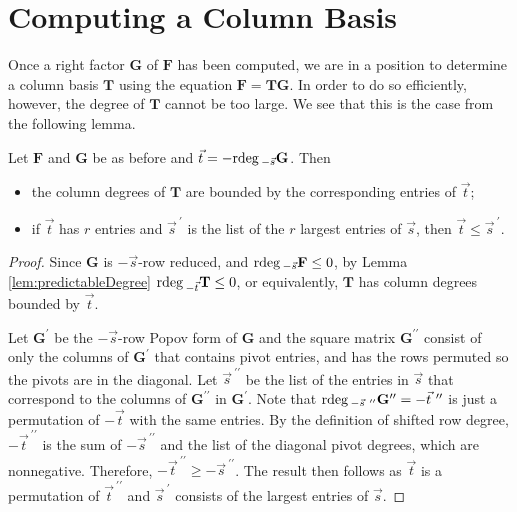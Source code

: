 
\section{Computing a Column Basis}

Once a right factor $\mathbf{G}$ of $\mathbf{F}$ has been computed,
we are in a position to determine a column basis $\mathbf{T}$ using
the equation $\mathbf{F}=\mathbf{T}\mathbf{G}$. In order to do so
efficiently, however, the degree of $\mathbf{T}$ cannot be too large.
We see that this is the case from the following lemma. 
\begin{lem}
\label{lem:colBasisdegreeBoundByRdegOfRightFactor} Let $\mathbf{F}$
and $\mathbf{G}$ be as before and $\vec{t}=-{\rm rdeg}\,_{-\vec{s}}\mathbf{G}$.
Then 
\begin{itemize}
\item the column degrees of $\mathbf{T}$ are bounded by the corresponding
entries of $\vec{t}$; 
\item if $\vec{t}$ has $r$ entries and $\vec{s}^{~\prime}$ is the list
of the $r$ largest entries of $\vec{s}$, then $\vec{t}\le\vec{s}^{~\prime}$. 
\end{itemize}
\end{lem}
\begin{proof}
Since $\mathbf{G}$ is $-\vec{s}$-row reduced, and ${\rm rdeg}\,_{-\vec{s}}\mathbf{F}\le0$,
by Lemma \ref{lem:predictableDegree} ${\rm rdeg}\,_{-\vec{t}}\mathbf{T}\le0$,
or equivalently, $\mathbf{T}$ has column degrees bounded by $\vec{t}$.

Let $\mathbf{G}^{\prime}$ be the $-\vec{s}$-row Popov form of $\mathbf{G}$
and the square matrix $\mathbf{G}^{\prime\prime}$ consist of only
the columns of $\mathbf{G}^{\prime}$ that contains pivot entries,
and has the rows permuted so the pivots are in the diagonal. Let $\vec{s}^{~\prime\prime}$
be the list of the entries in $\vec{s}$ that correspond to the columns
of $\mathbf{G}^{\prime\prime}$ in $\mathbf{G}^{\prime}$. Note that
${\rm rdeg}\,_{-\vec{s}^{~\prime\prime}}\mathbf{G}^{\prime\prime}=-\vec{t}^{~\prime\prime}$
is just a permutation of $-\vec{t}$ with the same entries. By the
definition of shifted row degree, $-\vec{t}^{~\prime\prime}$ is the
sum of $-\vec{s}^{~\prime\prime}$ and the list of the diagonal pivot
degrees, which are nonnegative. Therefore, $-\vec{t}^{~\prime\prime}\ge-\vec{s}^{~\prime\prime}$.
The result then follows as $\vec{t}$ is a permutation of $\vec{t}^{~\prime\prime}$
and $\vec{s}^{\ \prime}$ consists of the largest entries of $\vec{s}$. 
\end{proof}
